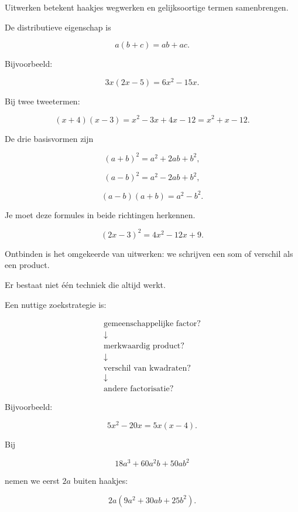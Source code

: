 \documentclass{ximera}
\begin{document}

Uitwerken betekent haakjes wegwerken en gelijksoortige termen samenbrengen.

De distributieve eigenschap is

\[
a(b+c)=ab+ac.
\]

Bijvoorbeeld:

\[
3x(2x-5)
=
6x^2-15x.
\]

Bij twee tweetermen:

\[
(x+4)(x-3)
=
x^2-3x+4x-12
=
x^2+x-12.
\]



De drie basisvormen zijn

\[
(a+b)^2=a^2+2ab+b^2,
\]

\[
(a-b)^2=a^2-2ab+b^2,
\]

\[
(a-b)(a+b)=a^2-b^2.
\]

Je moet deze formules in beide richtingen herkennen.

\begin{voorbeeld}
\[
(2x-3)^2
=
4x^2-12x+9.
\]
\end{voorbeeld}



Ontbinden is het omgekeerde van uitwerken: we schrijven een som of verschil als een product.

Er bestaat niet één techniek die altijd werkt.

Een nuttige zoekstrategie is:

\[
\boxed{
\begin{array}{c}
\text{gemeenschappelijke factor?}\\
\downarrow\\
\text{merkwaardig product?}\\
\downarrow\\
\text{verschil van kwadraten?}\\
\downarrow\\
\text{andere factorisatie?}
\end{array}}
\]



Bijvoorbeeld:

\[
5x^2-20x
=
5x(x-4).
\]

Bij

\[
18a^3+60a^2b+50ab^2
\]

nemen we eerst \(2a\) buiten haakjes:

\[
2a(9a^2+30ab+25b^2).
\]
\end{document}
